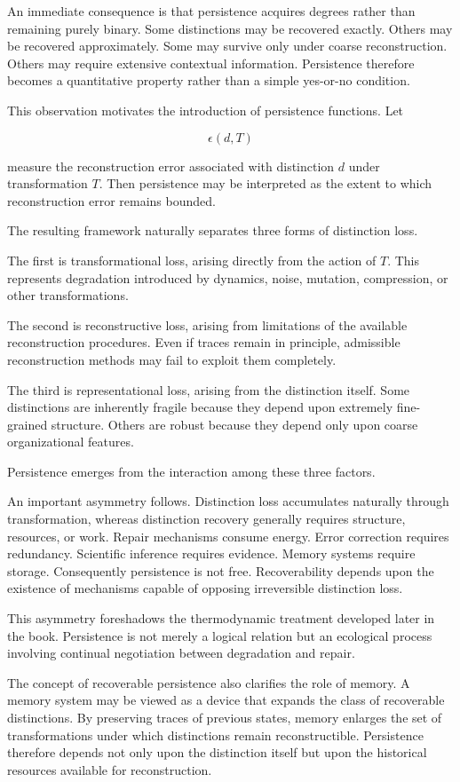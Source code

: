 \documentclass[12pt,oneside]{article}
\theoremstyle{definition}
\begin{document}
An immediate consequence is that persistence acquires degrees rather than remaining purely binary. Some distinctions may be recovered exactly. Others may be recovered approximately. Some may survive only under coarse reconstruction. Others may require extensive contextual information. Persistence therefore becomes a quantitative property rather than a simple yes-or-no condition.

This observation motivates the introduction of persistence functions. Let

\[
\epsilon(d,T)
\]

measure the reconstruction error associated with distinction \(d\) under transformation \(T\). Then persistence may be interpreted as the extent to which reconstruction error remains bounded.

The resulting framework naturally separates three forms of distinction loss.

The first is transformational loss, arising directly from the action of \(T\). This represents degradation introduced by dynamics, noise, mutation, compression, or other transformations.

The second is reconstructive loss, arising from limitations of the available reconstruction procedures. Even if traces remain in principle, admissible reconstruction methods may fail to exploit them completely.

The third is representational loss, arising from the distinction itself. Some distinctions are inherently fragile because they depend upon extremely fine-grained structure. Others are robust because they depend only upon coarse organizational features.

Persistence emerges from the interaction among these three factors.

An important asymmetry follows. Distinction loss accumulates naturally through transformation, whereas distinction recovery generally requires structure, resources, or work. Repair mechanisms consume energy. Error correction requires redundancy. Scientific inference requires evidence. Memory systems require storage. Consequently persistence is not free. Recoverability depends upon the existence of mechanisms capable of opposing irreversible distinction loss.

This asymmetry foreshadows the thermodynamic treatment developed later in the book. Persistence is not merely a logical relation but an ecological process involving continual negotiation between degradation and repair.

The concept of recoverable persistence also clarifies the role of memory. A memory system may be viewed as a device that expands the class of recoverable distinctions. By preserving traces of previous states, memory enlarges the set of transformations under which distinctions remain reconstructible. Persistence therefore depends not only upon the distinction itself but upon the historical resources available for reconstruction.
\end{document}
